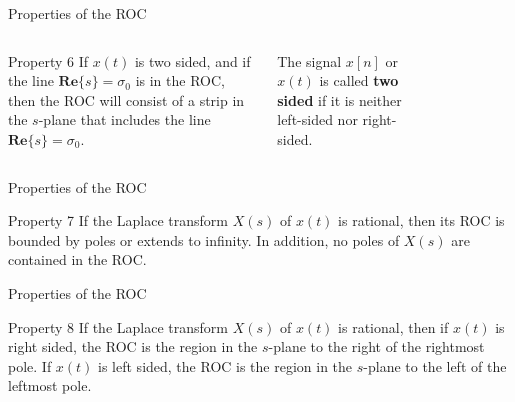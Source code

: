 \documentclass[aspectratio=169]{beamer}
\begin{document}
\begin{frame}{Properties of the ROC}
	\begin{columns}
		\begin{block}{Property 6}
			If $ x(t) $ is two sided, and if the line $ \mathbf{Re}\{s\}=\sigma_0 $ is in the ROC, then the
ROC will consist of a strip in the $ s $-plane that includes the line $ \mathbf{Re}\{s\}=\sigma_0 $.
		\end{block}
		
		
		\begin{definition}
			The signal $ x[n] $ or $ x(t) $ is called \textbf{two sided} if it is neither left-sided nor right-sided.
		\end{definition}
		
		
		\begin{figure}[h!]
			\centering
		\end{figure}
		
	\end{columns}
	
\end{frame}

\begin{frame}{Properties of the ROC}
	\begin{block}{Property 7}
		If the Laplace transform $ X(s) $ of $ x(t) $ is rational, then its ROC is bounded
		by poles or extends to infinity. In addition, no poles of $ X(s) $ are contained in the ROC.
	\end{block}
\end{frame}

\begin{frame}{Properties of the ROC}
	\begin{block}{Property 8}
		If the Laplace transform $ X(s) $ of $ x(t) $ is rational, then if $ x(t) $ is right sided,
the ROC is the region in the $ s $-plane to the right of the rightmost pole. If $ x(t) $ is left sided,
the ROC is the region in the $ s $-plane to the left of the leftmost pole.
	\end{block}
\end{frame}
\end{document}
